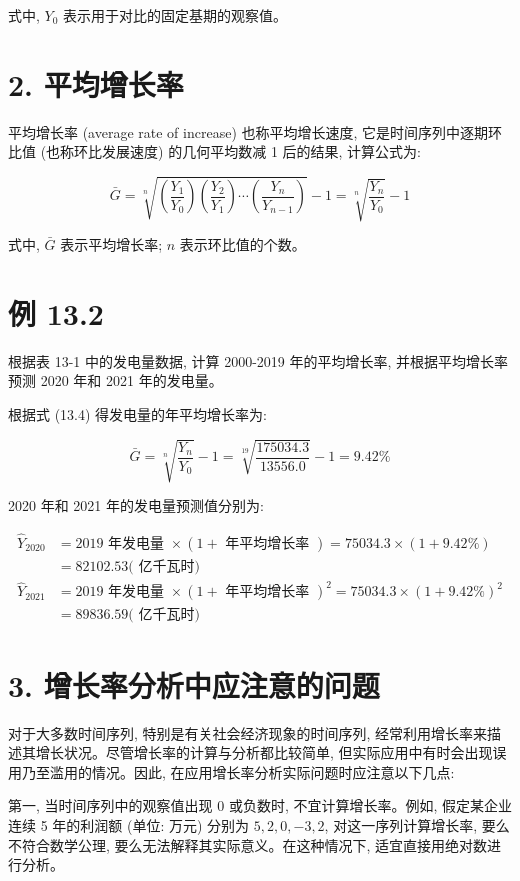 \documentclass[10pt]{article}
\begin{document}
\begin{CJK*}{UTF8}{bsmi}
式中, $Y_{0}$ 表示用于对比的固定基期的观察值。

\section*{2. 平均增长率}
平均增长率 (average rate of increase) 也称平均增长速度, 它是时间序列中逐期环比值 (也称环比发展速度) 的几何平均数减 1 后的结果, 计算公式为:


\begin{equation*}
\bar{G}=\sqrt[n]{\left(\frac{Y_{1}}{Y_{0}}\right)\left(\frac{Y_{2}}{Y_{1}}\right) \cdots\left(\frac{Y_{n}}{Y_{n-1}}\right)}-1=\sqrt[n]{\frac{Y_{n}}{Y_{0}}}-1 \tag{13.4}
\end{equation*}


式中, $\bar{G}$ 表示平均增长率; $n$ 表示环比值的个数。

\section*{例 13.2}
根据表 13-1 中的发电量数据, 计算 2000-2019 年的平均增长率, 并根据平均增长率预测 2020 年和 2021 年的发电量。

根据式 (13.4) 得发电量的年平均增长率为:

$$
\bar{G}=\sqrt[n]{\frac{Y_{n}}{Y_{0}}}-1=\sqrt[19]{\frac{175034.3}{13556.0}}-1=9.42 \%
$$

2020 年和 2021 年的发电量预测值分别为:

$$
\begin{aligned}
\hat{Y}_{2020} & =2019 \text { 年发电量 } \times(1+\text { 年平均增长率 })=75034.3 \times(1+9.42 \%) \\
& =82102.53(\text { 亿千瓦时) } \\
\hat{Y}_{2021} & =2019 \text { 年发电量 } \times(1+\text { 年平均增长率 })^{2}=75034.3 \times(1+9.42 \%)^{2} \\
& =89836.59(\text { 亿千瓦时) }
\end{aligned}
$$

\section*{3. 增长率分析中应注意的问题}
对于大多数时间序列, 特别是有关社会经济现象的时间序列, 经常利用增长率来描述其增长状况。尽管增长率的计算与分析都比较简单, 但实际应用中有时会出现误用乃至滥用的情况。因此, 在应用增长率分析实际问题时应注意以下几点:

第一, 当时间序列中的观察值出现 0 或负数时, 不宜计算增长率。例如, 假定某企业连续 5 年的利润额 (单位: 万元) 分别为 $5,2,0,-3,2$, 对这一序列计算增长率, 要么不符合数学公理, 要么无法解释其实际意义。在这种情况下, 适宜直接用绝对数进行分析。


\end{CJK*}
\end{document}
